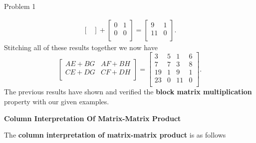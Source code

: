 \begin{problem}{Problem 1}
\begin{Highlight}[Solution]
\begin{align*}
\begin{bmatrix}
            \end{bmatrix}
            + 
            \begin{bmatrix}
                0 & 1 \\
                0 & 0 \\
            \end{bmatrix}
            =
            \begin{bmatrix}
                9 & 1 \\
                11 & 0 \\
            \end{bmatrix}.
        \end{align*}
        Stitching all of these results together we now have 
        \begin{equation*}
            \begin{bmatrix}
                AE + BG & AF + BH \\
                CE + DG & CF + DH \\
            \end{bmatrix}
            = 
            \begin{bmatrix}
                3 & 5 & 1 & 6 \\
                7 & 7 & 3 & 8 \\
                19 & 1 & 9 & 1 \\
                23 & 0 & 11 & 0 \\
            \end{bmatrix}.
        \end{equation*}
        The previous results have shown and verified the \textbf{block matrix multiplication} property with our given examples. \vspace*{1em}

        \noindent \textbf{Column Interpretation Of Matrix-Matrix Product} \vspace*{1em}

        The \textbf{column interpretation of matrix-matrix product} is as follows


\end{Highlight}
\end{problem}
